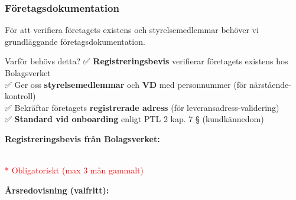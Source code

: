 \documentclass[10pt]{beamer}
\begin{document}
\begin{frame}[label=foretagsdokumentation]
  \frametitle{Företagsdokumentation}
  \small
  För att verifiera företagets existens och styrelsemedlemmar behöver vi grundläggande företagsdokumentation.
  
  \vspace{0.3cm}
  \begin{block}{Varför behövs detta?}
    \footnotesize
    ✅ \textbf{Registreringsbevis} verifierar företagets existens hos Bolagsverket\\
    ✅ Ger oss \textbf{styrelsemedlemmar} och \textbf{VD} med personnummer (för närstående-kontroll)\\
    ✅ Bekräftar företagets \textbf{registrerade adress} (för leveransadress-validering)\\
    ✅ \textbf{Standard vid onboarding} enligt PTL 2 kap. 7 § (kundkännedom)
  \end{block}
  
  \vspace{0.3cm}
  \begin{minipage}{0.48\textwidth}
    \textbf{Registreringsbevis från Bolagsverket:}\\
    \vspace{0.2cm}
    
    \\
    \vspace{0.2cm}
    \footnotesize\textcolor{red}{* Obligatoriskt (max 3 mån gammalt)}
    
  \end{minipage}
  \hfill
  \begin{minipage}{0.48\textwidth}
    \textbf{Årsredovisning (valfritt):}\\
    \vspace{0.2cm}
    

\end{minipage}
\end{frame}
\end{document}
